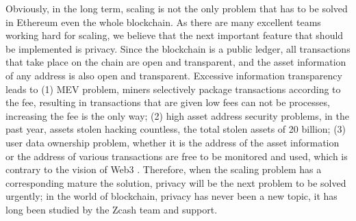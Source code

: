 Obviously, in the long term, scaling is not the only problem that has to be solved in Ethereum\cite{website:Ethereum} even the whole blockchain. As there are
many excellent teams working hard for scaling, we believe that the next important feature that should be implemented is privacy. Since the blockchain is 
a public ledger, all transactions that take place on the chain are open and transparent, 
and the asset information of any address is also open and transparent. Excessive 
information transparency leads to (1) MEV problem, miners selectively package 
transactions according to the fee, resulting in transactions that are given low fees can not be 
processes, increasing the fee is the only way; (2) high asset address security problems, in the past 
year, assets stolen hacking countless, the total stolen assets of 20 billion; (3) user data 
ownership problem, whether it is the address of the asset information or the address of 
various transactions are free to be monitored and used, which is contrary to 
the vision of Web3\cite{website:Web3} . Therefore, when the scaling problem has a corresponding mature 
the solution, privacy will be the next problem to be solved urgently; in the world of 
blockchain, privacy has never been a new topic, it has long been studied by the Zcash\cite{website:Zcash} team 
and support.





